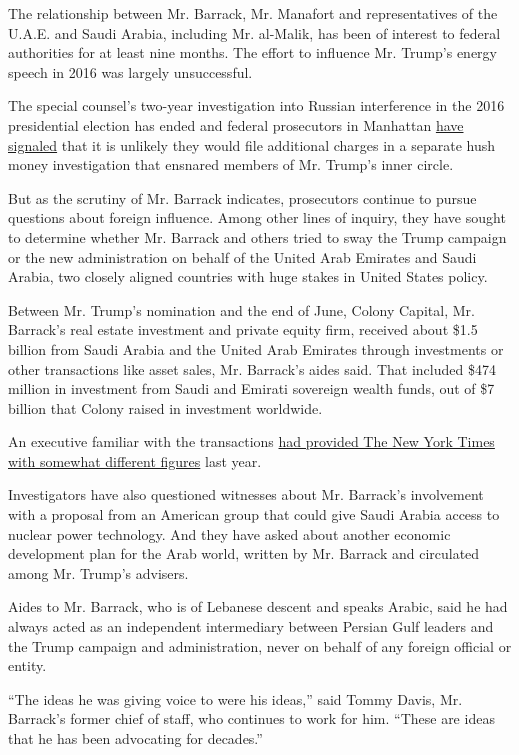 The relationship between Mr. Barrack, Mr. Manafort and representatives
of the U.A.E. and Saudi Arabia, including Mr. al-Malik, has been of
interest to federal authorities for at least nine months. The effort to
influence Mr. Trump's energy speech in 2016 was largely unsuccessful.

The special counsel's two-year investigation into Russian interference
in the 2016 presidential election has ended and federal prosecutors in
Manhattan
\href{https://www.nytimes.com/2019/07/18/nyregion/stormy-daniels-michael-cohen-documents.html}{have
signaled} that it is unlikely they would file additional charges in a
separate hush money investigation that ensnared members of Mr. Trump's
inner circle.

But as the scrutiny of Mr. Barrack indicates, prosecutors continue to
pursue questions about foreign influence. Among other lines of inquiry,
they have sought to determine whether Mr. Barrack and others tried to
sway the Trump campaign or the new administration on behalf of the
United Arab Emirates and Saudi Arabia, two closely aligned countries
with huge stakes in United States policy.

Between Mr. Trump's nomination and the end of June, Colony Capital, Mr.
Barrack's real estate investment and private equity firm, received about
\$1.5 billion from Saudi Arabia and the United Arab Emirates through
investments or other transactions like asset sales, Mr. Barrack's aides
said. That included \$474 million in investment from Saudi and Emirati
sovereign wealth funds, out of \$7 billion that Colony raised in
investment worldwide.

An executive familiar with the transactions
\href{https://www.nytimes.com/2018/06/13/world/middleeast/trump-tom-barrack-saudi.html}{had
provided The New York Times with somewhat different figures} last year.

Investigators have also questioned witnesses about Mr. Barrack's
involvement with a proposal from an American group that could give Saudi
Arabia access to nuclear power technology. And they have asked about
another economic development plan for the Arab world, written by Mr.
Barrack and circulated among Mr. Trump's advisers.

Aides to Mr. Barrack, who is of Lebanese descent and speaks Arabic, said
he had always acted as an independent intermediary between Persian Gulf
leaders and the Trump campaign and administration, never on behalf of
any foreign official or entity.

``The ideas he was giving voice to were his ideas,'' said Tommy Davis,
Mr. Barrack's former chief of staff, who continues to work for him.
``These are ideas that he has been advocating for decades.''

